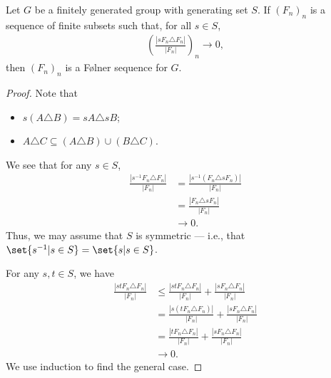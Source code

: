 \begin{lemma}
  Let $G$ be a finitely generated group with generating set $S$. If $\left(F_n\right)_n$ is a sequence of finite subsets such that, for all $s\in S$,
  \begin{align*}
    \left(\frac{\left\vert sF_n\triangle F_n \right\vert}{\left\vert F_n \right\vert}\right)_n\rightarrow 0,
  \end{align*}
  then $\left(F_n\right)_n$ is a Følner sequence for $G$.
\end{lemma}
\begin{proof}
  Note that
  \begin{itemize}
    \item $s\left(A\triangle B\right) = sA\triangle sB$;
    \item $A\triangle C \subseteq \left(A\triangle B\right) \cup \left(B\triangle C\right)$.
  \end{itemize}
  We see that for any $s\in S$,
  \begin{align*}
    \frac{\left\vert s^{-1}F_n\triangle F_n \right\vert}{\left\vert F_n \right\vert} &= \frac{\left\vert s^{-1}\left(F_n\triangle sF_n\right) \right\vert}{\left\vert F_n \right\vert}\\
                                                                                     &= \frac{\left\vert F_n\triangle sF_n \right\vert}{\left\vert F_n \right\vert}\\
                                                                                     &\rightarrow 0.
  \end{align*}
  Thus, we may assume that $S$ is symmetric --- i.e., that $\set{s^{-1}| s\in S} = \set{s | s\in S}$.\newline

  For any $s,t\in S$, we have
  \begin{align*}
    \frac{\left\vert stF_n\triangle F_n \right\vert}{\left\vert F_n \right\vert} &\leq \frac{\left\vert stF_n\triangle F_n \right\vert}{\left\vert F_n \right\vert} + \frac{\left\vert sF_n\triangle F_n \right\vert}{\left\vert F_n \right\vert}\\
                                                                                 &= \frac{\left\vert s\left(tF_n\triangle F_n\right) \right\vert}{\left\vert F_n \right\vert} + \frac{\left\vert sF_n\triangle F_n \right\vert}{\left\vert F_n \right\vert}\\
                                                                                 &= \frac{\left\vert tF_n\triangle F_n \right\vert}{\left\vert F_n \right\vert} + \frac{\left\vert sF_n\triangle F_n \right\vert}{\left\vert F_n \right\vert}\\
                                                                                 &\rightarrow 0.
  \end{align*}
  We use induction to find the general case.
\end{proof}
